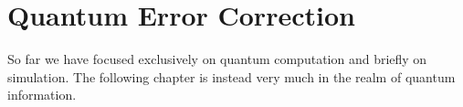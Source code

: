 \chapter{Quantum Error Correction}
\label{chapt9}

So far we have focused exclusively on quantum computation and briefly on simulation. The following chapter is instead very much in the realm of quantum information.